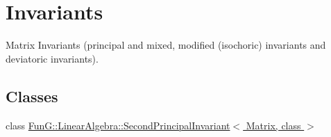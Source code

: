 \hypertarget{group__InvariantGroup}{\section{Invariants}
\label{group__InvariantGroup}
}


Matrix Invariants (principal and mixed, modified (isochoric) invariants and deviatoric invariants).  


\subsection*{Classes}
\begin{DoxyCompactItemize}
\item 
class \hyperlink{classFunG_1_1LinearAlgebra_1_1SecondPrincipalInvariant}{Fun\-G\-::\-Linear\-Algebra\-::\-Second\-Principal\-Invariant$<$ Matrix, class $>$}
\end{DoxyCompactItemize}
